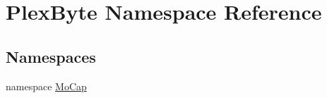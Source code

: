 \hypertarget{namespace_plex_byte}{}\section{Plex\+Byte Namespace Reference}
\label{namespace_plex_byte}
\subsection*{Namespaces}
\begin{DoxyCompactItemize}
\item 
namespace \hyperlink{namespace_plex_byte_1_1_mo_cap}{Mo\+Cap}
\end{DoxyCompactItemize}
